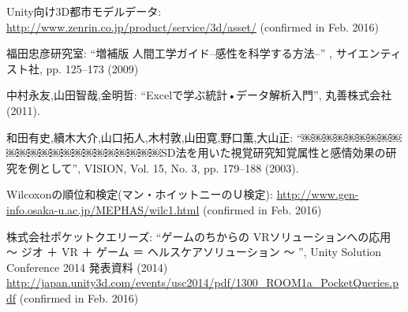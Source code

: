 \begin{thebibliography}{20}
Unity向け3D都市モデルデータ: \url{http://www.zenrin.co.jp/product/service/3d/asset/} (confirmed in Feb. 2016)

福田忠彦研究室: ``増補版 人間工学ガイド--感性を科学する方法--'' , サイエンティスト社, pp. 125--173 (2009)

中村永友,山田智哉,金明哲: ``Excelで学ぶ統計•データ解析入門'', 丸善株式会社 (2011).

和田有史,續木大介,山口拓人,木村敦,山田寛,野口薫,大山正: ``￼￼￼￼￼￼￼￼￼￼￼￼￼￼￼￼￼￼￼￼￼￼￼SD法を用いた視覚研究知覚属性と感情効果の研究を例として'', VISION, Vol. 15, No. 3, pp. 179--188 (2003).

Wilcoxonの順位和検定(マン・ホイットニーのＵ検定): \url{ http://www.gen-info.osaka-u.ac.jp/MEPHAS/wilc1.html} (confirmed in Feb. 2016)

株式会社ポケットクエリーズ: ``ゲームのちからの VRソリューションへの応用 〜 ジオ ＋ VR ＋ ゲーム ＝ ヘルスケアソリューション 〜	'', Unity Solution Conference 2014 発表資料 (2014)
\url{http://japan.unity3d.com/events/usc2014/pdf/1300_ROOM1a_PocketQueries.pdf} (confirmed in Feb. 2016)

\end{thebibliography}
\hspace{15pt}